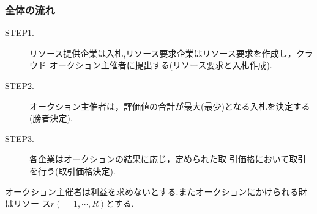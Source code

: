 \documentclass{ujarticle}
\begin{document}
\subsubsection{全体の流れ}
\begin{description}
\item [STEP1.] {リソース提供企業は入札,リソース要求企業はリソース要求を作成し，クラウド
    オークション主催者に提出する(リソース要求と入札作成).}
\item [STEP2.] {オークション主催者は，評価値の合計が最大(最少)となる入札を決定する(勝者決定).}
\item [STEP3.] {各企業はオークションの結果に応じ，定められた取 引価格において取引を行う(取引価格決定).}
\end{description}
オークション主催者は利益を求めないとする.またオークションにかけられる財はリソー
ス$r(=1,\cdots ,R)$とする.
\end{document}
